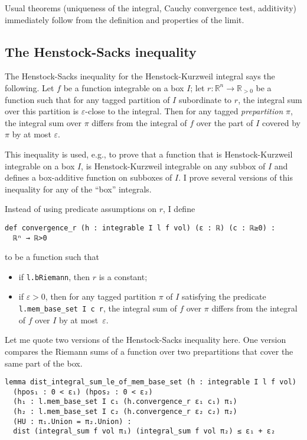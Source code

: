 \documentclass[a4paper, UKenglish,cleveref, autoref, thm-restate]{lipics-v2021}
\newcommand{\bbR}{\mathbb{R}}
\newcommand{\eps}{\varepsilon}
\begin{document}
Usual theorems (uniqueness of the integral, Cauchy convergence test,
additivity) immediately follow from the definition and properties of
the limit.

\subsection{The Henstock-Sacks inequality}%
\label{sec:henst-sacks-ineq}

The Henstock-Sacks inequality for the Henstock-Kurzweil integral says
the following. Let \(f\) be a function integrable on a box \(I\); let
\(r\colon \bbR^{n} \to \bbR_{>0}\) be a function such that for any
tagged partition of \(I\) subordinate to \(r\), the integral sum over
this partition is \(\eps\)-close to the integral. Then for any tagged
\emph{prepartition} \(\pi\), the integral sum over \(\pi\) differs
from the integral of \(f\) over the part of \(I\) covered by \(\pi\)
by at most \(\eps\).

This inequality is used, e.g., to prove that a function that is
Henstock-Kurzweil integrable on a box \(I\), is Henstock-Kurzweil
integrable on any subbox of \(I\) and defines a box-additive function
on subboxes of \(I\). I prove several versions of this inequality for
any of the \enquote{box} integrals.

Instead of using predicate assumptions on \(r\), I define
\begin{lstlisting}
def convergence_r (h : integrable I l f vol) (ε : ℝ) (c : ℝ≥0) :
  ℝⁿ → ℝ>0
\end{lstlisting}
to be a function such that
\begin{itemize}
\item if \lstinline=l.bRiemann=, then \(r\) is a constant;
\item if \(\eps > 0\), then for any tagged partition \(\pi\) of \(I\)
  satisfying the predicate \lstinline=l.mem_base_set I c r=, the
  integral sum of \(f\) over \(\pi\) differs from the integral of
  \(f\) over \(I\) by at most~\(\eps\).
\end{itemize}

Let me quote two versions of the Henstock-Sacks inequality here. One
version compares the Riemann sums of a function over two prepartitions
that cover the same part of the box.
\begin{lstlisting}
lemma dist_integral_sum_le_of_mem_base_set (h : integrable I l f vol)
  (hpos₁ : 0 < ε₁) (hpos₂ : 0 < ε₂)
  (h₁ : l.mem_base_set I c₁ (h.convergence_r ε₁ c₁) π₁)
  (h₂ : l.mem_base_set I c₂ (h.convergence_r ε₂ c₂) π₂)
  (HU : π₁.Union = π₂.Union) :
  dist (integral_sum f vol π₁) (integral_sum f vol π₂) ≤ ε₁ + ε₂
\end{lstlisting}
\end{document}
